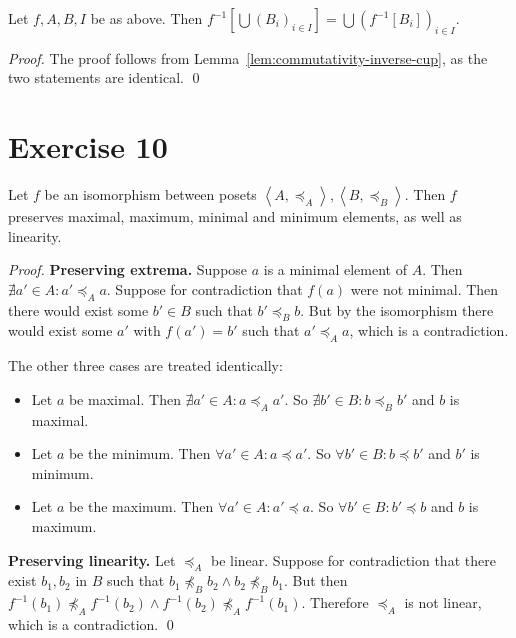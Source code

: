 \documentclass[11pt]{llncs}
\begin{document}
\begin{lemma}
  Let $f, A, B, I$ be as above. Then
  $f^{-1}[\bigcup (B_i)_{i \in I}] = \bigcup (f^{-1}[B_i])_{i \in I}$.
\end{lemma}
\begin{proof}
  The proof follows from Lemma~\ref{lem:commutativity-inverse-cup}, as the
  two statements are identical.
  \qed
\end{proof}

\section*{Exercise 10}

\begin{lemma}
  Let $f$ be an isomorphism between posets $\left<A, \preccurlyeq_A\right>,
  \left<B, \preccurlyeq_B\right>$.
  Then $f$ preserves maximal, maximum, minimal and minimum elements, as well
  as linearity.
\end{lemma}
\begin{proof}
  \item
  \textbf{Preserving extrema.}
  Suppose $a$ is a minimal element of $A$. Then
  $\nexists a' \in A: a' \preccurlyeq_A a$.
  Suppose for contradiction that $f(a)$ were not minimal. Then there would exist
  some $b' \in B$ such that $b' \preccurlyeq_B b$. But by the isomorphism
  there would exist some $a'$ with $f(a') = b'$ such that $a' \preccurlyeq_A a$,
  which is a contradiction.

  The other three cases are treated identically:
  \begin{itemize}
  \item Let $a$ be maximal. Then
  $\nexists a' \in A: a \preccurlyeq_A a'$. So
  $\nexists b' \in B: b \preccurlyeq_B b'$ and $b$ is maximal.

  \item Let $a$ be the minimum. Then
  $\forall a' \in A: a \preccurlyeq a'$. So
  $\forall b' \in B: b \preccurlyeq b'$ and $b'$ is minimum.

  \item Let $a$ be the maximum. Then
  $\forall a' \in A: a' \preccurlyeq a$. So
  $\forall b' \in B: b' \preccurlyeq b$ and $b$ is maximum.
  \end{itemize}

  \item
  \textbf{Preserving linearity.}
  Let $\preccurlyeq_A$ be linear. Suppose for contradiction that there exist
  $b_1, b_2$ in $B$ such that
  $b_1 \not\preccurlyeq_B b_2 \land b_2 \not\preccurlyeq_B b_1$.
  But then $f^{-1}(b_1) \not\preccurlyeq_A f^{-1}(b_2) \land f^{-1}(b_2)
  \not\preccurlyeq_A f^{-1}(b_1)$. Therefore $\preccurlyeq_A$ is not linear,
  which is a contradiction.
  \qed
\end{proof}
\end{document}

